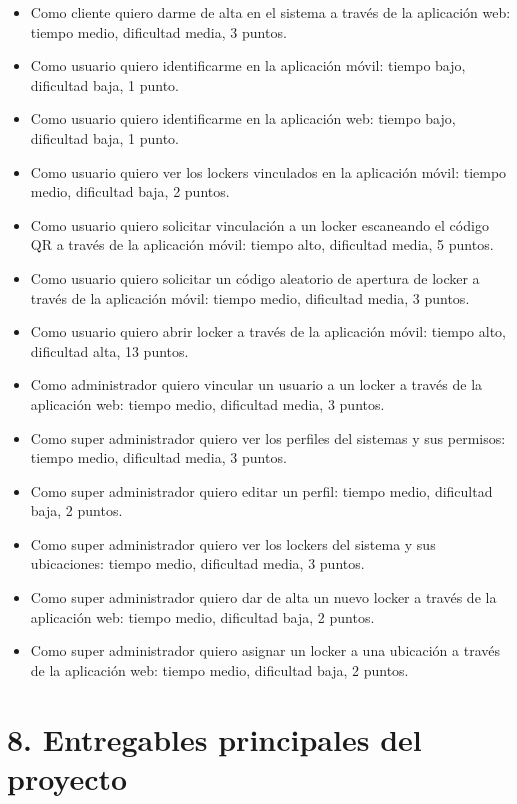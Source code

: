 \documentclass[
11pt, %
]{charter}
\begin{document}
\begin{itemize}
	\item Como cliente quiero darme de alta en el sistema a través de la aplicación web: tiempo medio, dificultad media, 3 puntos.
	\item Como usuario quiero identificarme en la aplicación móvil: tiempo bajo, dificultad baja, 1 punto.
	\item Como usuario quiero identificarme en la aplicación web: tiempo bajo, dificultad baja, 1 punto.	
	\item Como usuario quiero ver los lockers vinculados en la aplicación móvil: tiempo medio, dificultad baja, 2 puntos.
	\item Como usuario quiero solicitar vinculación a un locker escaneando el código QR a través de la aplicación móvil: tiempo alto, dificultad media, 5 puntos.
	\item Como usuario quiero solicitar un código aleatorio de apertura de locker a través de la aplicación móvil: tiempo medio, dificultad media, 3 puntos.
	\item Como usuario quiero abrir locker a través de la aplicación móvil: tiempo alto, dificultad alta, 13 puntos.
	\item Como administrador quiero vincular un usuario a un locker a través de la aplicación web: tiempo medio, dificultad media, 3 puntos.
	\item Como super administrador quiero ver los perfiles del sistemas y sus permisos: tiempo medio, dificultad media, 3 puntos.
	\item Como super administrador quiero editar un perfil: tiempo medio, dificultad baja, 2 puntos.	
	\item Como super administrador quiero ver los lockers del sistema y sus ubicaciones: tiempo medio, dificultad media, 3 puntos.
	\item Como super administrador quiero dar de alta un nuevo locker a través de la aplicación web: tiempo medio, dificultad baja, 2 puntos.	
	\item Como super administrador quiero asignar un locker a una ubicación a través de la aplicación web: tiempo medio, dificultad baja, 2 puntos.	
\end{itemize}

\section{8. Entregables principales del proyecto}
\label{sec:entregables}
\end{document}
